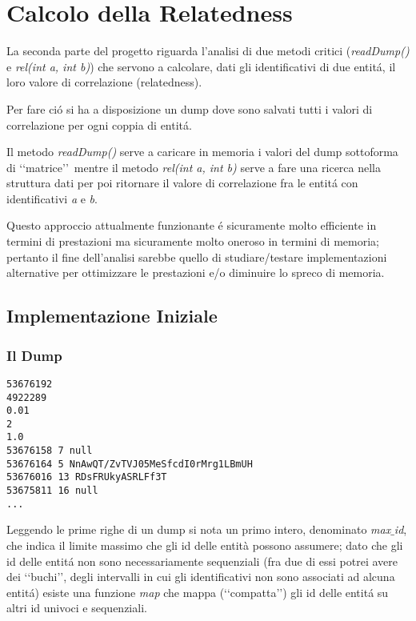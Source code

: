 \chapter{Calcolo della Relatedness}

La seconda parte del progetto riguarda l'analisi di due metodi critici (\textit{readDump()} e \textit{rel(int a, int b)}) che servono a 
calcolare, dati gli identificativi di due entit\'a, il loro valore di correlazione (relatedness). 

Per fare ci\'o si ha a disposizione un dump dove sono salvati tutti i valori di correlazione per ogni coppia di entit\'a. 

Il metodo \textit{readDump()} serve a caricare in memoria i valori del dump 
sottoforma di \lq\lq matrice\rq\rq\ mentre il metodo \textit{rel(int a, int b)} serve a fare una ricerca nella struttura dati per poi ritornare il valore di 
correlazione fra le entit\'a con identificativi \textit{a} e \textit{b}.

Questo approccio attualmente funzionante \'e sicuramente molto efficiente in termini di prestazioni ma sicuramente molto oneroso in termini di memoria; 
pertanto il fine dell'analisi sarebbe quello di studiare/testare implementazioni alternative per ottimizzare le prestazioni e/o diminuire lo spreco di memoria.  

\section{Implementazione Iniziale}

\subsection{Il Dump}
\begin{lstlisting}[style=TeXStyle]
53676192
4922289
0.01
2
1.0
53676158 7 null
53676164 5 NnAwQT/ZvTVJ05MeSfcdI0rMrg1LBmUH
53676016 13 RDsFRUkyASRLFf3T
53675811 16 null
...
\end{lstlisting}

Leggendo le prime righe di un dump si nota un primo intero, denominato \textit{max$\_$id}, che indica il limite massimo che gli id delle entità possono assumere; 
dato che gli id delle entit\'a non sono necessariamente sequenziali 
(fra due di essi potrei avere dei \lq\lq buchi\rq\rq, degli intervalli in cui gli identificativi non sono associati ad alcuna entit\'a) 
esiste una funzione \textit{map} che mappa (\lq\lq compatta\rq\rq) gli id delle entit\'a su altri id univoci e sequenziali. 


